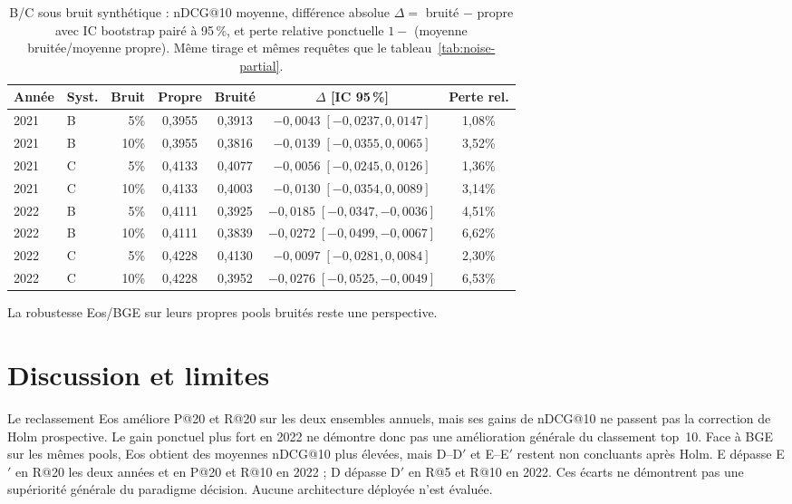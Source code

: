 \documentclass{article}
\begin{document}
\begin{table}[t]
  \caption{B/C sous bruit synthétique : nDCG@10 moyenne, différence absolue $\Delta =$ bruité $-$ propre avec IC bootstrap pairé à 95\,\%, et perte relative ponctuelle $1-$ (moyenne bruitée/moyenne propre). Même tirage et mêmes requêtes que le tableau~\ref{tab:noise-partial}.}
  \label{tab:noise-semantic}
  \centering
  \small
  \begin{tabular}{llrcccc}
    \toprule
    Année & Syst. & Bruit & Propre & Bruité & $\Delta$ [IC 95\,\%] & Perte rel. \\
    \midrule
    2021 & B & 5\% & 0{,}3955 & 0{,}3913 & $-0{,}0043\;[-0{,}0237, 0{,}0147]$ & 1{,}08\% \\
    2021 & B & 10\% & 0{,}3955 & 0{,}3816 & $-0{,}0139\;[-0{,}0355, 0{,}0065]$ & 3{,}52\% \\
    2021 & C & 5\% & 0{,}4133 & 0{,}4077 & $-0{,}0056\;[-0{,}0245, 0{,}0126]$ & 1{,}36\% \\
    2021 & C & 10\% & 0{,}4133 & 0{,}4003 & $-0{,}0130\;[-0{,}0354, 0{,}0089]$ & 3{,}14\% \\
    \midrule
    2022 & B & 5\% & 0{,}4111 & 0{,}3925 & $-0{,}0185\;[-0{,}0347, -0{,}0036]$ & 4{,}51\% \\
    2022 & B & 10\% & 0{,}4111 & 0{,}3839 & $-0{,}0272\;[-0{,}0499, -0{,}0067]$ & 6{,}62\% \\
    2022 & C & 5\% & 0{,}4228 & 0{,}4130 & $-0{,}0097\;[-0{,}0281, 0{,}0084]$ & 2{,}30\% \\
    2022 & C & 10\% & 0{,}4228 & 0{,}3952 & $-0{,}0276\;[-0{,}0525, -0{,}0049]$ & 6{,}53\% \\
    \bottomrule
  \end{tabular}
\end{table}

La robustesse Eos/BGE sur leurs propres pools bruités reste une perspective.

\section{Discussion et limites}
\label{sec:discussion}

Le reclassement Eos améliore P@20 et R@20 sur les deux ensembles annuels, mais ses gains de nDCG@10 ne passent pas la correction de Holm prospective. Le gain ponctuel plus fort en 2022 ne démontre donc pas une amélioration générale du classement top~10. Face à BGE sur les mêmes pools, Eos obtient des moyennes nDCG@10 plus élevées, mais D--D$'$ et E--E$'$ restent non concluants après Holm. E dépasse E$'$ en R@20 les deux années et en P@20 et R@10 en 2022 ; D dépasse D$'$ en R@5 et R@10 en 2022. Ces écarts ne démontrent pas une supériorité générale du paradigme décision. Aucune architecture déployée n'est évaluée.
\end{document}
